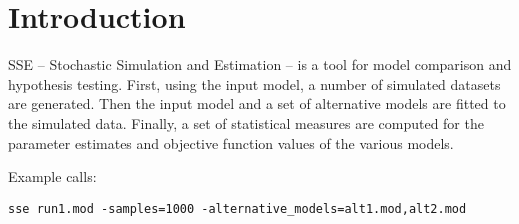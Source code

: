 



\maketitle


\section{Introduction}


SSE – Stochastic Simulation and Estimation – is a tool for model comparison and hypothesis testing. First, using the input model, a number of simulated datasets are generated. Then the input model and a set of alternative models are fitted to the simulated data. Finally, a set of statistical measures are computed for the parameter estimates and objective function values of the various models. 

Example calls:
\begin{verbatim}
sse run1.mod -samples=1000 -alternative_models=alt1.mod,alt2.mod
\end{verbatim}

